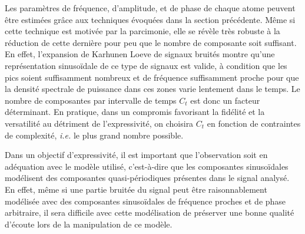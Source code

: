 Les paramètres de fréquence, d'amplitude, et de phase de chaque atome peuvent être estimées grâce aux techniques évoquées dans la section précédente. Même si cette technique est motivée par la parcimonie, elle se révèle très robuste à la réduction de cette dernière pour peu que le nombre de composante soit suffisant. En effet, l'expansion de Karhunen Loeve de signaux bruités montre qu'une représentation sinusoïdale de ce type de signaux est valide, à condition que les pics soient suffisamment nombreux et de fréquence suffisamment proche pour que la densité spectrale de puissance dans ces zones varie lentement dans le temps\cite{mcaulay}. Le nombre de composantes par intervalle de temps $C_t$ est donc un facteur déterminant. En pratique, dans un compromis favorisant la fidélité et la versatilité au détriment de l'expressivité, on choisira $C_t$ en fonction de contraintes de complexité, \textit{i.e.} le plus grand nombre possible.




Dans un objectif d'expressivité, il est important que l'observation  soit en adéquation avec le modèle utilisé, c'est-à-dire que les composantes sinusoïdales modélisent des composantes quasi-périodiques présentes dans le signal analysé. En effet, même si une partie bruitée du signal peut être raisonnablement modélisée avec des composantes sinusoïdales de fréquence proches et de phase arbitraire, il sera difficile avec cette modélisation de préserver une bonne qualité d'écoute lors de la manipulation de ce modèle.

